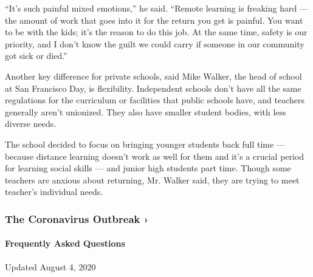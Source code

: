 ``It's such painful mixed emotions,'' he said. ``Remote learning is
freaking hard --- the amount of work that goes into it for the return
you get is painful. You want to be with the kids; it's the reason to do
this job. At the same time, safety is our priority, and I don't know the
guilt we could carry if someone in our community got sick or died.''

Another key difference for private schools, said Mike Walker, the head
of school at San Francisco Day, is flexibility. Independent schools
don't have all the same regulations for the curriculum or facilities
that public schools have, and teachers generally aren't unionized. They
also have smaller student bodies, with less diverse needs.

The school decided to focus on bringing younger students back full time
--- because distance learning doesn't work as well for them and it's a
crucial period for learning social skills --- and junior high students
part time. Though some teachers are anxious about returning, Mr. Walker
said, they are trying to meet teacher's individual needs.

\href{https://www.nytimes.com/news-event/coronavirus?action=click\&pgtype=Article\&state=default\&region=MAIN_CONTENT_3\&context=storylines_faq}{}

\hypertarget{the-coronavirus-outbreak-}{%
\subsubsection{The Coronavirus Outbreak
›}\label{the-coronavirus-outbreak-}}

\hypertarget{frequently-asked-questions}{%
\paragraph{Frequently Asked
Questions}\label{frequently-asked-questions}}

Updated August 4, 2020

